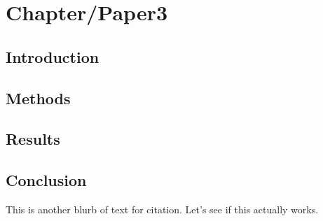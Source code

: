 \chapter{Chapter/Paper3}

\section{Introduction}

\section{Methods}

\section{Results}

\section {Conclusion}

This is another blurb of text for citation.\textsuperscript{\cite{Achanta2016,Ahmadi2020,Booy2018}} Let's see if this actually works.

